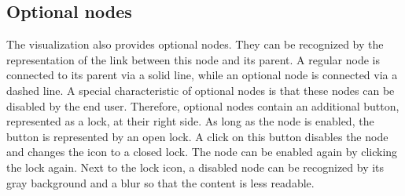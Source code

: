 \subsection{Optional nodes}\label{sec:optional-nodes}
The visualization also provides optional nodes. They can be recognized by the representation of the link between this node and its parent. A regular node is connected to its parent via a solid line, while an optional node is connected via a dashed line. A special characteristic of optional nodes is that these nodes can be disabled by the end user. Therefore, optional nodes contain an additional button, represented as a lock, at their right side. As long as the node is enabled, the button is represented by an open lock. A click on this button disables the node and changes the icon to a closed lock. The node can be enabled again by clicking the lock again. Next to the lock icon, a disabled node can be recognized by its gray background and a blur so that the content is less readable.














